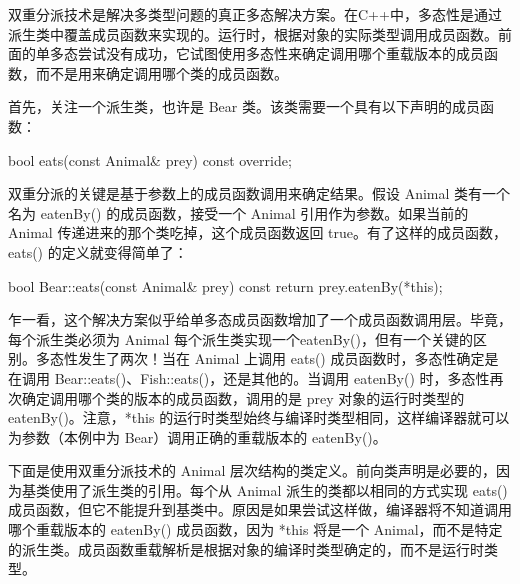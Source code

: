 
双重分派技术是解决多类型问题的真正多态解决方案。在C++中，多态性是通过派生类中覆盖成员函数来实现的。运行时，根据对象的实际类型调用成员函数。前面的单多态尝试没有成功，它试图使用多态性来确定调用哪个重载版本的成员函数，而不是用来确定调用哪个类的成员函数。

首先，关注一个派生类，也许是 Bear 类。该类需要一个具有以下声明的成员函数：

\begin{cpp}
bool eats(const Animal& prey) const override;
\end{cpp}

双重分派的关键是基于参数上的成员函数调用来确定结果。假设 Animal 类有一个名为 eatenBy() 的成员函数，接受一个 Animal 引用作为参数。如果当前的 Animal 传递进来的那个类吃掉，这个成员函数返回 true。有了这样的成员函数，eats() 的定义就变得简单了：

\begin{cpp}
bool Bear::eats(const Animal& prey) const
{
    return prey.eatenBy(*this);
}
\end{cpp}

乍一看，这个解决方案似乎给单多态成员函数增加了一个成员函数调用层。毕竟，每个派生类必须为 Animal 每个派生类实现一个eatenBy()，但有一个关键的区别。多态性发生了两次！当在 Animal 上调用 eats() 成员函数时，多态性确定是在调用 Bear::eats()、Fish::eats()，还是其他的。当调用 eatenBy() 时，多态性再次确定调用哪个类的版本的成员函数，调用的是 prey 对象的运行时类型的 eatenBy()。注意，*this 的运行时类型始终与编译时类型相同，这样编译器就可以为参数（本例中为 Bear）调用正确的重载版本的 eatenBy()。

下面是使用双重分派技术的 Animal 层次结构的类定义。前向类声明是必要的，因为基类使用了派生类的引用。每个从 Animal 派生的类都以相同的方式实现 eats() 成员函数，但它不能提升到基类中。原因是如果尝试这样做，编译器将不知道调用哪个重载版本的 eatenBy() 成员函数，因为 *this 将是一个 Animal，而不是特定的派生类。成员函数重载解析是根据对象的编译时类型确定的，而不是运行时类型。

